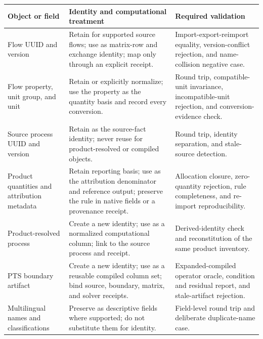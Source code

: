 \documentclass[
  10pt,
  a4paper,
  DIV=11,
  numbers=noendperiod]{scrartcl}
\newcounter{none} %
\begin{document}
{\def\LTcaptype{none} %
\begin{longtable}[]{@{}
  >{\raggedright\arraybackslash}p{}
  >{\raggedright\arraybackslash}p{}
  >{\raggedright\arraybackslash}p{}@{}}
\toprule\noalign{}
\begin{minipage}[b]{\linewidth}\raggedright
Object or field
\end{minipage} & \begin{minipage}[b]{\linewidth}\raggedright
Identity and computational treatment
\end{minipage} & \begin{minipage}[b]{\linewidth}\raggedright
Required validation
\end{minipage} \\
\midrule\noalign{}
\endhead
\bottomrule\noalign{}
\endlastfoot
Flow UUID and version & Retain for supported source flows; use as
matrix-row and exchange identity; map only through an explicit receipt.
& Import-export-reimport equality, version-conflict rejection, and
name-collision negative case. \\
Flow property, unit group, and unit & Retain or explicitly normalize;
use the property as the quantity basis and record every conversion. &
Round trip, compatible-unit invariance, incompatible-unit rejection, and
conversion-evidence check. \\
Source process UUID and version & Retain as the source-fact identity;
never reuse for product-resolved or compiled objects. & Round trip,
identity separation, and stale-source detection. \\
Product quantities and attribution metadata & Retain reporting basis;
use as the attribution denominator and reference output; preserve the
rule in native fields or a provenance receipt. & Allocation closure,
zero-quantity rejection, rule completeness, and re-import
reproducibility. \\
Product-resolved process & Create a new identity; use as a normalized
computational column; link to the source process and receipt. &
Derived-identity check and reconstitution of the same product
inventory. \\
PTS boundary artifact & Create a new identity; use as a reusable
compiled column set; bind source, boundary, matrix, and solver receipts.
& Expanded-compiled operator oracle, condition and residual report, and
stale-artifact rejection. \\
Multilingual names and classifications & Preserve as descriptive fields
where supported; do not substitute them for identity. & Field-level
round trip and deliberate duplicate-name case. \\
\end{longtable}
}
\end{document}
